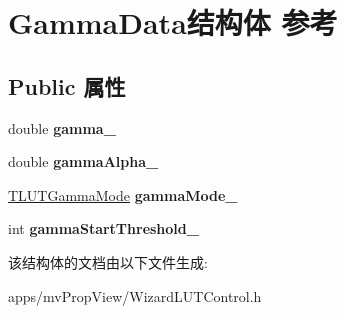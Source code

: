 \hypertarget{struct_gamma_data}{\section{Gamma\+Data结构体 参考}
\label{struct_gamma_data}
}
\subsection*{Public 属性}
\begin{DoxyCompactItemize}
\item 
\hypertarget{struct_gamma_data_a3d6d2cad523521ab74f465bd0fff1b85}{double {\bfseries gamma\+\_\+}}\label{struct_gamma_data_a3d6d2cad523521ab74f465bd0fff1b85}

\item 
\hypertarget{struct_gamma_data_ad3e3ed68efbdf6926178309487faef14}{double {\bfseries gamma\+Alpha\+\_\+}}\label{struct_gamma_data_ad3e3ed68efbdf6926178309487faef14}

\item 
\hypertarget{struct_gamma_data_a65c00184a7231ae28d135d66851386d5}{\hyperlink{group___common_interface_gab9c7c29f6e598477f67fefe0b30addb0}{T\+L\+U\+T\+Gamma\+Mode} {\bfseries gamma\+Mode\+\_\+}}\label{struct_gamma_data_a65c00184a7231ae28d135d66851386d5}

\item 
\hypertarget{struct_gamma_data_adef2e8f158dedc4641a025b71158082d}{int {\bfseries gamma\+Start\+Threshold\+\_\+}}\label{struct_gamma_data_adef2e8f158dedc4641a025b71158082d}

\end{DoxyCompactItemize}


该结构体的文档由以下文件生成\+:\begin{DoxyCompactItemize}
\item 
apps/mv\+Prop\+View/Wizard\+L\+U\+T\+Control.\+h\end{DoxyCompactItemize}
